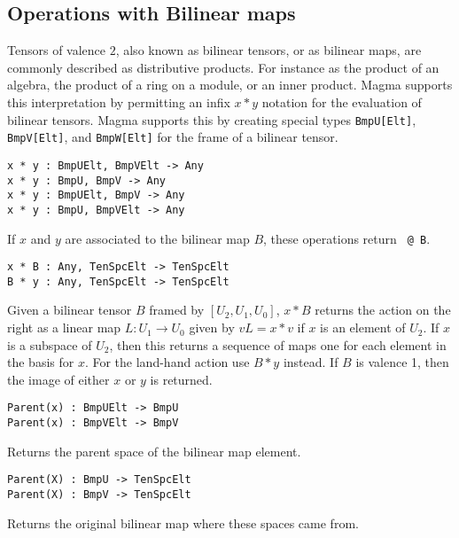 \subsection{Operations with Bilinear maps}
Tensors of valence $2$, also known as bilinear tensors, or
as bilinear maps,  are commonly described as distributive products.
For instance as the product of an algebra, the product of a ring on 
a module, or an inner product.  Magma supports this interpretation 
by permitting an infix $x*y$ notation for the evaluation of bilinear
tensors.  Magma supports this by creating special types 
{\tt BmpU[Elt]}, {\tt BmpV[Elt]}, and {\tt BmpW[Elt]} for the frame
of a bilinear tensor.


\color{blue}
{\small \begin{verbatim}
x * y : BmpUElt, BmpVElt -> Any
x * y : BmpU, BmpV -> Any
x * y : BmpUElt, BmpV -> Any
x * y : BmpU, BmpVElt -> Any
\end{verbatim} }
\color{black}

If $x$ and $y$ are associated to the bilinear map $B$, these operations return 
{\tt <x,y> @ B}.

\color{blue}
{\small \begin{verbatim}
x * B : Any, TenSpcElt -> TenSpcElt
B * y : Any, TenSpcElt -> TenSpcElt
\end{verbatim} }
\color{black}

Given a bilinear tensor $B$ framed by $[U_2,U_1,U_0]$,
$x*B$ returns the action on the right as a 
linear map $L : U_1\rightarrow U_0$ given 
by $vL = x* v$ if $x$ is an element of $U_2$. 
If $x$ is a subspace of $U_2$, then this returns a sequence of 
maps one for each element in the basis for $x$.
For the land-hand action use $B*y$ instead.
If $B$ is valence 1, then the image of either $x$ or $y$ is returned.

\color{blue}
{\small \begin{verbatim}
Parent(x) : BmpUElt -> BmpU
Parent(x) : BmpVElt -> BmpV
\end{verbatim} }
\color{black}

Returns the parent space of the bilinear map element.

\color{blue}
{\small \begin{verbatim}
Parent(X) : BmpU -> TenSpcElt
Parent(X) : BmpV -> TenSpcElt
\end{verbatim} }
\color{black}

Returns the original bilinear map where these spaces came from.

